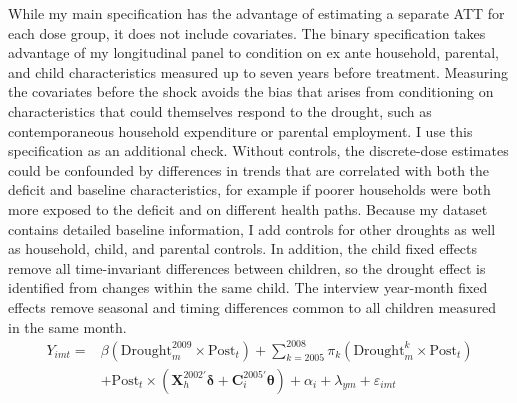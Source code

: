 \documentclass[12pt]{article}
\begin{document}
While my main specification has the advantage of estimating a separate ATT for each dose group, it does not include covariates. The binary specification takes advantage of my longitudinal panel to condition on ex ante household, parental, and child characteristics measured up to seven years before treatment. Measuring the covariates before the shock avoids the bias that arises from conditioning on characteristics that could themselves respond to the drought, such as contemporaneous household expenditure or parental employment. I use this specification as an additional check. Without controls, the discrete-dose estimates could be confounded by differences in trends that are correlated with both the deficit and baseline characteristics, for example if poorer households were both more exposed to the deficit and on different health paths. Because my dataset contains detailed baseline information, I add controls for other droughts as well as household, child, and parental controls. In addition, the child fixed effects remove all time-invariant differences between children, so the drought effect is identified from changes within the same child. The interview year-month fixed effects remove seasonal and timing differences common to all children measured in the same month.
\begin{equation}
\begin{split}
Y_{imt} = {} & \beta\left(\text{Drought}_m^{2009} \times \text{Post}_t\right) + \sum_{k=2005}^{2008} \pi_k \left(\text{Drought}_m^{k} \times \text{Post}_t\right) \\
& + \text{Post}_t \times \left(\mathbf{X}_h^{2002\prime}\boldsymbol{\delta} + \mathbf{C}_i^{2005\prime}\boldsymbol{\theta}\right) + \alpha_i + \lambda_{ym} + \varepsilon_{imt}
\end{split}
\label{eq:binary}
\end{equation}
\end{document}
